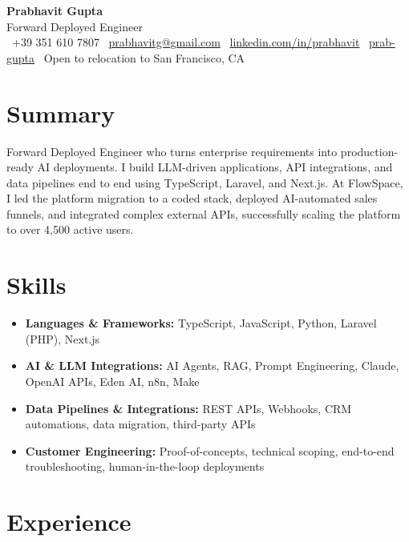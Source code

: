 \documentclass[a4paper,10pt]{article}
\begin{document}
\begin{center}
 {\Huge\bfseries Prabhavit Gupta}\\[3pt]
 {\color{accent}\large Forward Deployed Engineer}\\[5pt]
 \faPhone\ +39 351 610 7807 \quad
 \faEnvelope\ \href{mailto:prabhavitg@gmail.com}{prabhavitg@gmail.com} \quad
 \faLinkedin\ \href{https://www.linkedin.com/in/prabhavit/}{linkedin.com/in/prabhavit} \quad
 \faGithub\ \href{https://github.com/prab-gupta}{prab-gupta} \quad
 \faMapMarker*\ Open to relocation to San Francisco, CA
\end{center}

\section{Summary}
Forward Deployed Engineer who turns enterprise requirements into production-ready AI deployments. I build LLM-driven applications, API integrations, and data pipelines end to end using TypeScript, Laravel, and Next.js. At FlowSpace, I led the platform migration to a coded stack, deployed AI-automated sales funnels, and integrated complex external APIs, successfully scaling the platform to over 4,500 active users.

\section{Skills}
\begin{itemize}
 \item \textbf{Languages \& Frameworks:} TypeScript, JavaScript, Python, Laravel (PHP), Next.js
 \item \textbf{AI \& LLM Integrations:} AI Agents, RAG, Prompt Engineering, Claude, OpenAI APIs, Eden AI, n8n, Make
 \item \textbf{Data Pipelines \& Integrations:} REST APIs, Webhooks, CRM automations, data migration, third-party APIs
 \item \textbf{Customer Engineering:} Proof-of-concepts, technical scoping, end-to-end troubleshooting, human-in-the-loop deployments
\end{itemize}

\section{Experience}
\end{document}
